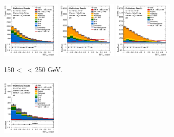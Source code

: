 \vspace*{\fill}
\begin{figure}[h!]
    \centering
    \begin{subfigure}[b]{\textwidth}
        \centering
        \includegraphics[width=0.32\textwidth]{Images/VH/Own_fit/postfit_VHbb/Region_distmva_BMax250_BMin150_DSR_J2_TTypebb_T2_L0_Y6051_GlobalFit_conditionnal_mu1.png}
        \includegraphics[width=0.32\textwidth]{Images/VH/Own_fit/postfit_VHbb/Region_distmva_BMax250_BMin150_DSR_J3_TTypebb_T2_L0_Y6051_GlobalFit_conditionnal_mu1.png}
        \includegraphics[width=0.32\textwidth]{Images/VH/Own_fit/postfit_VHbb/Region_distmva_BMax250_BMin150_DSR_J4_TTypebb_T2_L0_Y6051_GlobalFit_conditionnal_mu1.png}
        \caption{150 < \ptv\ < 250 GeV.}
        \label{fig:plots_VHbb_OL_150_SR}
    \end{subfigure}
    \begin{subfigure}[b]{\textwidth}
        \centering
        \includegraphics[width=0.32\textwidth]{Images/VH/Own_fit/postfit_VHbb/Region_distmva_BMax400_BMin250_DSR_J2_TTypebb_T2_L0_Y6051_GlobalFit_conditionnal_mu1.png}

\end{subfigure}
\end{figure}
